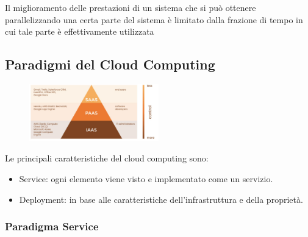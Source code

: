\documentclass{article}
\begin{document}
		
		Il miglioramento delle prestazioni di un sistema che si può ottenere parallelizzando una certa parte del sistema è limitato dalla frazione di tempo in cui tale parte è effettivamente utilizzata
		
		\subsection{Paradigmi del Cloud Computing}
		
		\begin{figure}[ht]
		\centering
		\includegraphics[width=0.5\textwidth]{SAC_04.png}
		\end{figure}
		
		Le principali caratteristiche del cloud computing sono:
		\begin{itemize}
		    \item Service: ogni elemento viene visto e implementato come un servizio. 
		    \item Deployment: in base alle caratteristiche dell'infrastruttura e della proprietà.
		\end{itemize}
		
		\subsubsection{Paradigma Service}
		
\end{document}
